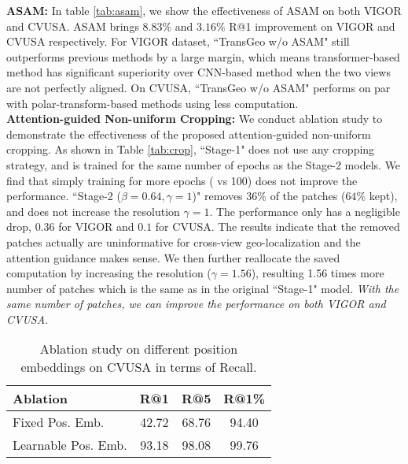 \documentclass[10pt,twocolumn,letterpaper]{article}
\begin{document}
\noindent\textbf{ASAM:} In table \ref{tab:asam}, we show the effectiveness of ASAM on both VIGOR and CVUSA. ASAM brings $8.83\%$ and $3.16\%$ R@1 improvement on VIGOR and CVUSA respectively. For VIGOR dataset, ``TransGeo w/o ASAM" still outperforms previous methods by a large margin, which means transformer-based method has significant superiority over CNN-based method when the two views are not perfectly aligned. On CVUSA, ``TransGeo w/o ASAM" performs on par with polar-transform-based methods using less computation.  \\
\noindent\textbf{Attention-guided Non-uniform Cropping:} We conduct ablation study to demonstrate the effectiveness of the proposed attention-guided non-uniform cropping. As shown in Table \ref{tab:crop}, ``Stage-1" does not use any cropping strategy, and is trained for the same number of epochs as the Stage-2 models. We find that simply training for more epochs ( vs 100) does not improve the performance. ``Stage-2 ($\beta = 0.64, \gamma=1$)" removes $36\%$ of the patches ($64\%$ kept), and does not increase the resolution $\gamma=1$. The performance only has a negligible drop, \ie $0.36$ for VIGOR and $0.1$ for CVUSA. The results indicate that the removed patches actually are uninformative for cross-view geo-localization and the attention guidance makes sense. We then further reallocate the saved computation by increasing the resolution ($\gamma=1.56$), resulting 1.56 times more number of patches which is the same as in the original ``Stage-1" model. \emph{With the same number of patches, we can improve the performance on both VIGOR and CVUSA.} \\
\begin{table}[!htbp]
\centering
    \begin{tabular}{l c c c} 
    \hline
    
    \hline
    Ablation & R@1 & R@5 & R@1\% \\
    \hline
Fixed Pos. Emb.  & 42.72 & 68.76 & 94.40 \\
        Learnable Pos. Emb. & 93.18 & 98.08 & 99.76 \\
    \hline
    
    \hline
    \end{tabular}
    \caption{Ablation study on different position embeddings on CVUSA in terms of Recall. }\vspace{-0.2cm}
    \label{tab:position}
\end{table}
\end{document}
